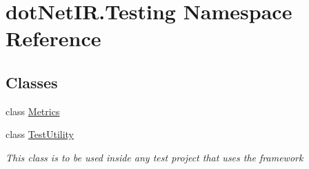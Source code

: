 \hypertarget{namespacedot_net_i_r_1_1_testing}{}\section{dot\+Net\+I\+R.\+Testing Namespace Reference}
\label{namespacedot_net_i_r_1_1_testing}
\subsection*{Classes}
\begin{DoxyCompactItemize}
\item 
class \hyperlink{classdot_net_i_r_1_1_testing_1_1_metrics}{Metrics}
\item 
class \hyperlink{classdot_net_i_r_1_1_testing_1_1_test_utility}{Test\+Utility}
\begin{DoxyCompactList}\small\item\em This class is to be used inside any test project that uses the framework \end{DoxyCompactList}\end{DoxyCompactItemize}
